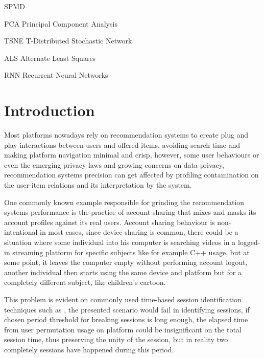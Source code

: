 \documentclass[ecp,tc,english]{iiufrgs}
\begin{document}
\listoffigures 
\listoftables 

\begin{listofabbrv}{SPMD}
    \item[PCA] Principal Component Analysis
    \item[TSNE] T-Distributed Stochastic Network
    \item[ALS] Alternate Least Squares
    \item[RNN] Recurrent Neural Networks
\end{listofabbrv}

\tableofcontents %


\chapter{Introduction}
Most platforms nowadays rely on recommendation systems to create plug and play interactions between users and offered items, avoiding search time and making platform navigation minimal and crisp, however, some user behaviours or even the emerging privacy laws and growing concerns on data privacy, recommendation systems precision can get affected by profiling contamination on the user-item relations  and its interpretation by the system.

One commonly known example responsible for grinding the recommendation systems performance is the practice of account sharing that mixes and masks its account profiles against its real users. Account sharing behaviour is non-intentional in most cases, since device sharing is common, there could be a situation where some individual into his computer is searching videos in a logged-in streaming platform for specific subjects like for example C++ usage, but at some point, it leaves the computer empty without performing account logout, another individual then starts using the same device and platform but for a completely different subject, like children's cartoon.

This problem is evident on commonly used time-based session identification techniques such as \cite{10.1145/2736277.2741117}, the presented scenario would fail in identifying sessions, if chosen period threshold for breaking sessions is long enough, the elapsed time from user permutation usage on platform could be insignificant on the total session time, thus preserving the unity of the session, but in reality two completely sessions have happened during this period.
\end{document}
